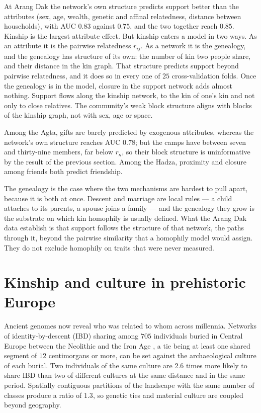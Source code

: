 At Arang Dak the network's own structure predicts support better than the attributes
(sex, age, wealth, genetic and affinal relatedness, distance between households), with
AUC $0.83$ against $0.75$, and the two together reach $0.85$. Kinship is the largest
attribute effect. But kinship enters a model in two ways. As an attribute it is the
pairwise relatedness $r_{ij}$. As a network it is the genealogy, and the genealogy has
structure of its own: the number of kin two people share, and their distance in the kin
graph. That structure predicts support beyond pairwise relatedness, and it does so in
every one of $25$ cross-validation folds. Once the genealogy is in the model, closure in
the support network adds almost nothing. Support flows along the kinship network, to the
kin of one's kin and not only to close relatives. The community's weak block structure
aligns with blocks of the kinship graph, not with sex, age or space.

Among the Agta, gifts are barely predicted by exogenous attributes, whereas the network's own
structure reaches AUC $0.78$; but the camps have between seven and thirty-nine members,
far below $r_\kappa$, so their block structure is uninformative by the result of the
previous section. Among the Hadza, proximity and closure among friends both predict
friendship.

The genealogy is the case where the two mechanisms are hardest to pull apart, because it
is both at once. Descent and marriage are local rules --- a child attaches to its
parents, a spouse joins a family --- and the genealogy they grow is the substrate on which
kin homophily is usually defined. What the Arang Dak data establish is that support
follows the structure of that network, the paths through it, beyond the pairwise
similarity that a homophily model would assign. They do not exclude homophily on traits
that were never measured.

\section{Kinship and culture in prehistoric Europe}

Ancient genomes now reveal who was related to whom across millennia. Networks of
identity-by-descent (IBD) sharing among $705$ individuals buried in Central Europe between
the Neolithic and the Iron Age \citep{ringbauer2024,mallick2024}, a tie being at least one
shared segment of $12$ centimorgans or more, can be set against the archaeological culture
of each burial. Two individuals of the same culture are $2.6$ times more likely to share
IBD than two of different cultures at the same distance and in the same period. Spatially
contiguous partitions of the landscape with the same number of classes produce a ratio of
$1.3$, so genetic ties and material culture are coupled beyond geography.

